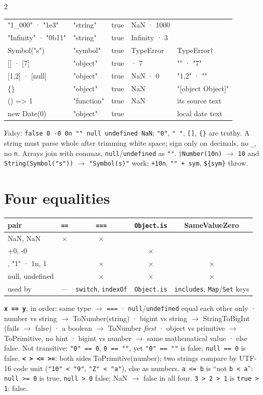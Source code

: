 \documentclass[8pt]{extarticle}
\newcommand\eqq{\hbox{=}\hbox{=}}
\newcommand\eqqq{\hbox{=}\hbox{=}\hbox{=}}
\newcommand\gee{\hbox{>}\hbox{=}}
\newcommand\lee{\hbox{<}\hbox{=}}
\newcommand\fat{\hbox{=}\hbox{>}}
\newcommand\bq{\textasciigrave}
\newcommand\ct[1]{\texttt{#1}}
\newcommand\yes{\textcolor{sheetGreen}{\checkmark}}
\newcommand\no{\textcolor{sheetRed}{$\times$}}
\begin{document}
\begin{multicols}{2}
{\begin{tabular}{@{}>{\ttfamily}l>{\ttfamily}l>{\ttfamily}l>{\ttfamily}l>{\ttfamily}l@{}}
"1\_000" · "1e3" & "string" & true & NaN · 1000 & \\
"Infinity" · "0b11" & "string" & true & Infinity · 3 & \\
Symbol("s") & "symbol" & true & TypeError & TypeError†\\
{}[] · [7] & "object" & true & 0 · 7 & "" · "7"\\
{}[1,2] · [null] & "object" & true & NaN · 0 & "1,2" · ""\\
\{\} & "object" & true & NaN & "[object Object]"\\
() \fat{} 1 & "function" & true & NaN & \normalfont its source text\\
new Date(0) & "object" & true & 0 & \normalfont local date text\\
\bottomrule
\end{tabular}}\par
Falsy: \ct{false 0 -0 0n "" null undefined NaN}; \ct{"0"}, \ct{" "}, \ct{[]},
\ct{\{\}} are truthy. A string must parse whole after trimming white space; sign only on
decimals, no \ct{\_}, no \ct{n}. Arrays join with commas, \ct{null}/\ct{undefined} as
\ct{""}. †\ct{Number(10n)} $\to$ \ct{10} and \ct{String(Symbol("s"))} $\to$
\ct{"Symbol(s)"} work; \ct{+10n}, \ct{"" + sym}, \ct{\bq\$\{sym\}\bq} throw.

\section{Four equalities}
{\scriptsize\setlength{\tabcolsep}{3pt}
\begin{tabular}{@{}>{\ttfamily}lcccc@{}}
\toprule
\normalfont\textbf{pair} & \ct{\eqq} & \ct{\eqqq} & \ct{Object.is} & \textbf{SameValueZero}\\
\midrule
NaN, NaN & \no & \no & \yes & \yes\\
+0, -0 & \yes & \yes & \no & \yes\\
1, "1" · 1n, 1 & \yes & \no & \no & \no\\
null, undefined & \yes & \no & \no & \no\\
\midrule
\normalfont used by & \normalfont — & \normalfont\ct{switch}, \ct{indexOf} & \normalfont\ct{Object.is} & \normalfont\ct{includes}, \ct{Map}/\ct{Set} keys\\
\bottomrule
\end{tabular}}\par
\textbf{\ct{x \eqq{} y}}, in order: same type $\to$ \ct{\eqqq} · \ct{null}/\ct{undefined}
equal each other only · number vs string $\to$ ToNumber(string) · bigint vs string $\to$
StringToBigInt (fails $\to$ false) · a boolean $\to$ ToNumber \emph{first} · object vs
primitive $\to$ ToPrimitive, no hint · bigint vs number $\to$ same mathematical value · else
false. Not transitive: \ct{"0" \eqq{} 0}, \ct{0 \eqq{} ""}, yet \ct{"0" \eqq{} ""} is
false; \ct{null \eqq{} 0} is false.
\textbf{\ct{< > \lee{} \gee}}: both sides ToPrimitive(number); two strings compare by UTF-16
code unit (\ct{"10" < "9"}, \ct{"Z" < "a"}), else as numbers. \ct{a \lee{} b} is
``not \ct{b < a}'': \ct{null \gee{} 0} is true, \ct{null > 0} false; NaN $\to$ false in
all four. \ct{3 > 2 > 1} is \ct{true > 1}: false.


\end{multicols}
\end{document}
